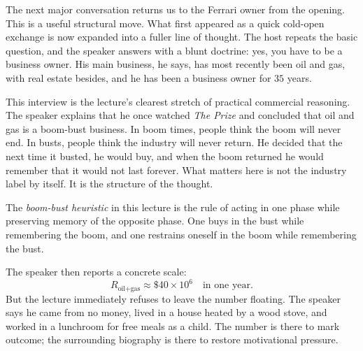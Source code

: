 The next major conversation returns us to the Ferrari owner from the opening. This is a useful structural move. What first appeared as a quick cold-open exchange is now expanded into a fuller line of thought. The host repeats the basic question, and the speaker answers with a blunt doctrine: yes, you have to be a business owner. His main business, he says, has most recently been oil and gas, with real estate besides, and he has been a business owner for \(35\) years.

This interview is the lecture's clearest stretch of practical commercial reasoning. The speaker explains that he once watched \emph{The Prize} and concluded that oil and gas is a boom-bust business. In boom times, people think the boom will never end. In busts, people think the industry will never return. He decided that the next time it busted, he would buy, and when the boom returned he would remember that it would not last forever. What matters here is not the industry label by itself. It is the structure of the thought.

\begin{definition}
The \emph{boom-bust heuristic} in this lecture is the rule of acting in one phase while preserving memory of the opposite phase. One buys in the bust while remembering the boom, and one restrains oneself in the boom while remembering the bust.
\end{definition}

\begin{figure}
\begin{center}
\end{center}
\end{figure}

The speaker then reports a concrete scale:
\begin{equation}
R_{\text{oil+gas}} \approx \$40\times 10^6 \quad \text{in one year}.
\end{equation}
But the lecture immediately refuses to leave the number floating. The speaker says he came from no money, lived in a house heated by a wood stove, and worked in a lunchroom for free meals as a child. The number is there to mark outcome; the surrounding biography is there to restore motivational pressure.

